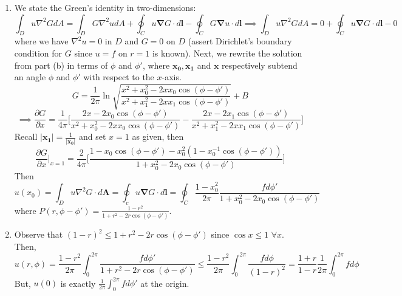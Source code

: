 \documentclass[a4paper]{article}
\begin{document}
\begin{ans}
\begin{enumerate}[label=(\alph*)]
\item We state the Green's identity in two-dimensions:
$$\int_D u\nabla^2GdA=\int_D G\nabla^2udA+\oint_C u\boldsymbol{\nabla}G\cdot d\mathbf{l}-\oint_C G\boldsymbol{\nabla}u\cdot d\mathbf{l}\implies\int_Du\nabla^2GdA=0+\oint_Cu\boldsymbol{\nabla}G\cdot d\mathbf{l}-0$$
where we have $\nabla^2u=0$ in $D$ and $G=0$ on $D$ (assert Dirichlet's boundary condition for $G$ since $u=f$ on $r=1$ is known). Next, we rewrite the solution from part (b) in terms of $\phi$ and $\phi'$, where $\mathbf{x_0},\mathbf{x_1}$ and $\mathbf{x}$ respectively subtend an angle $\phi$ and $\phi'$ with respect to the $x$-axis.
$$G=\frac{1}{2\pi}\ln\sqrt{\frac{x^2+x_0^2-2xx_0\cos(\phi-\phi')} {x^2+x_1^2-2xx_1\cos(\phi-\phi')}}+B$$
$$\implies\frac{\partial G}{\partial x}=\frac{1}{4\pi}\bigg[\frac{2x-2x_0\cos(\phi-\phi')}{x^2+x_0^2-2xx_0\cos(\phi-\phi')}-\frac{2x-2x_1\cos(\phi-\phi')}{x^2+x_1^2-2xx_1\cos(\phi-\phi')}\bigg]$$
Recall $|\mathbf{x_1}|=\frac{1}{|\mathbf{x_0}|}$ and set $x=1$ as given, then
$$\frac{\partial G}{\partial x}\bigg|_{x=1}=\frac{2}{4\pi}\bigg[\frac{1-x_0\cos(\phi-\phi')-x_0^2(1-x_0^{-1}\cos(\phi-\phi'))}{1+x_0^2-2x_0\cos(\phi-\phi')}\bigg]$$
Then
$$u(x_0)=\int_Du\nabla^2G\cdot d\mathbf{A}=\oint_cu\boldsymbol{\nabla}G\cdot d\mathbf{l}=\oint_C\frac{1-x_0^2}{2\pi}\frac{fd\phi'}{1+x_0^2-2x_0\cos(\phi-\phi')}$$
where $P(r,\phi-\phi')=\frac{1-r^2}{1+r^2-2r\cos(\phi-\phi')}$.
\item Observe that $(1-r)^2\leq 1+r^2-2r\cos(\phi-\phi')$ since $\cos x\leq 1$ $\forall x$. Then,
$$u(r,\phi)=\frac{1-r^2}{2\pi}\int_0^{2\pi}\frac{fd\phi'}{1+r^2-2r\cos(\phi-\phi')}\leq\frac{1-r^2}{2\pi}\int_0^{2\pi}\frac{fd\phi}{(1-r)^2}=\frac{1+r}{1-r}\frac{1}{2\pi}\int_0^{2\pi}fd\phi$$
But, $u(0)$ is exactly $\frac{1}{2\pi}\int_0^{2\pi}fd\phi'$ at the origin.
\end{enumerate}
\end{ans}
\newpage
\end{document}
